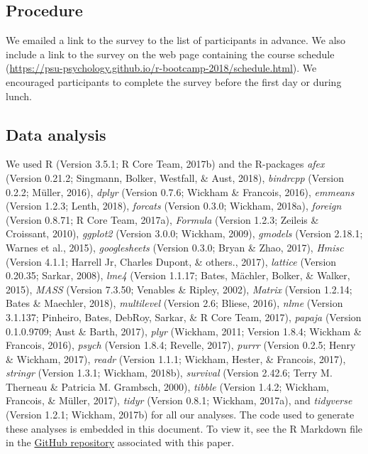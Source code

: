 \documentclass[english,man]{apa6}
\theoremstyle{definition}
\theoremstyle{definition}
\theoremstyle{definition}
\theoremstyle{remark}
\begin{document}
\subsection{Procedure}\label{procedure}

We emailed a link to the survey to the list of participants in advance.
We also include a link to the survey on the web page containing the
course schedule
(\url{https://psu-psychology.github.io/r-bootcamp-2018/schedule.html}).
We encouraged participants to complete the survey before the first day
or during lunch.

\subsection{Data analysis}\label{data-analysis}

We used R (Version 3.5.1; R Core Team, 2017b) and the R-packages
\emph{afex} (Version 0.21.2; Singmann, Bolker, Westfall, \& Aust, 2018),
\emph{bindrcpp} (Version 0.2.2; Müller, 2016), \emph{dplyr} (Version
0.7.6; Wickham \& Francois, 2016), \emph{emmeans} (Version 1.2.3; Lenth,
2018), \emph{forcats} (Version 0.3.0; Wickham, 2018a), \emph{foreign}
(Version 0.8.71; R Core Team, 2017a), \emph{Formula} (Version 1.2.3;
Zeileis \& Croissant, 2010), \emph{ggplot2} (Version 3.0.0; Wickham,
2009), \emph{gmodels} (Version 2.18.1; Warnes et al., 2015),
\emph{googlesheets} (Version 0.3.0; Bryan \& Zhao, 2017), \emph{Hmisc}
(Version 4.1.1; Harrell Jr, Charles Dupont, \& others., 2017),
\emph{lattice} (Version 0.20.35; Sarkar, 2008), \emph{lme4} (Version
1.1.17; Bates, Mächler, Bolker, \& Walker, 2015), \emph{MASS} (Version
7.3.50; Venables \& Ripley, 2002), \emph{Matrix} (Version 1.2.14; Bates
\& Maechler, 2018), \emph{multilevel} (Version 2.6; Bliese, 2016),
\emph{nlme} (Version 3.1.137; Pinheiro, Bates, DebRoy, Sarkar, \& R Core
Team, 2017), \emph{papaja} (Version 0.1.0.9709; Aust \& Barth, 2017),
\emph{plyr} (Wickham, 2011; Version 1.8.4; Wickham \& Francois, 2016),
\emph{psych} (Version 1.8.4; Revelle, 2017), \emph{purrr} (Version
0.2.5; Henry \& Wickham, 2017), \emph{readr} (Version 1.1.1; Wickham,
Hester, \& Francois, 2017), \emph{stringr} (Version 1.3.1; Wickham,
2018b), \emph{survival} (Version 2.42.6; Terry M. Therneau \& Patricia
M. Grambsch, 2000), \emph{tibble} (Version 1.4.2; Wickham, Francois, \&
Müller, 2017), \emph{tidyr} (Version 0.8.1; Wickham, 2017a), and
\emph{tidyverse} (Version 1.2.1; Wickham, 2017b) for all our analyses.
The code used to generate these analyses is embedded in this document.
To view it, see the R Markdown file in the
\href{http://github.com/psu-psychology/r-bootcamp-2018/talks}{GitHub
repository} associated with this paper.
\end{document}
